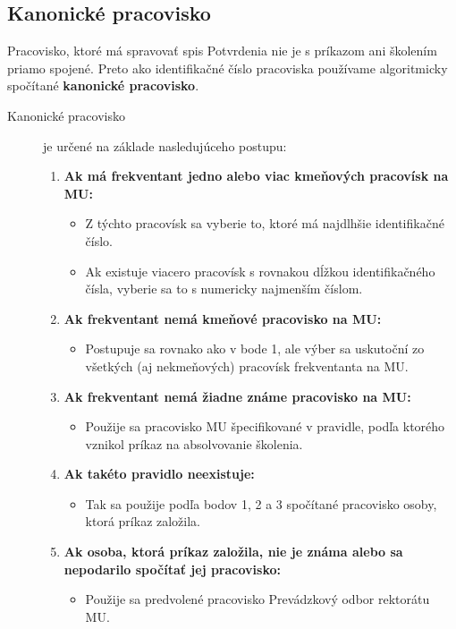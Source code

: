 \documentclass[
  digital,     %
  oneside,     %
  nosansbold,  %
  nocolorbold, %
  lof,         %
  nolot,         %
]{fithesis4}
\begin{document}
\subsection*{Kanonické pracovisko}
Pracovisko, ktoré má spravovať spis Potvrdenia nie je s príkazom ani školením priamo spojené. Preto ako identifikačné číslo pracoviska používame algoritmicky spočítané \textbf{kanonické pracovisko}.
\begin{description}
    \item[Kanonické pracovisko] je určené na základe nasledujúceho postupu:
    \begin{enumerate}
        \item \textbf{Ak má frekventant jedno alebo viac kmeňových pracovísk na MU:}
        \begin{itemize}
            \item Z týchto pracovísk sa vyberie to, ktoré má najdlhšie identifikačné číslo.
            \item Ak existuje viacero pracovísk s rovnakou dĺžkou identifikačného čísla, vyberie sa to s numericky najmenším číslom.
        \end{itemize}
        \item \textbf{Ak frekventant nemá kmeňové pracovisko na MU:}
        \begin{itemize}
            \item Postupuje sa rovnako ako v bode 1, ale výber sa uskutoční zo všetkých (aj nekmeňových) pracovísk frekventanta na MU.
        \end{itemize}
        \item \textbf{Ak frekventant nemá žiadne známe pracovisko na MU:}
        \begin{itemize}
            \item Použije sa pracovisko MU špecifikované v pravidle, podľa ktorého vznikol príkaz na absolvovanie školenia.
        \end{itemize}
        \item \textbf{Ak takéto pravidlo neexistuje:}
        \begin{itemize}
            \item Tak sa použije podľa bodov 1, 2 a 3 spočítané pracovisko osoby, ktorá príkaz založila.
        \end{itemize}
        \item \textbf{Ak osoba, ktorá príkaz založila, nie je známa alebo sa nepodarilo spočítať jej pracovisko:}
        \begin{itemize}
            \item Použije sa predvolené pracovisko Prevádzkový odbor rektorátu MU.
        \end{itemize}
    \end{enumerate}
\end{description}
\end{document}
